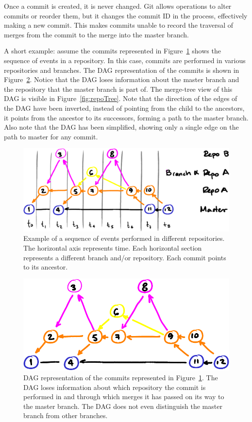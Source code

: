 \documentclass[conference, draftclsnofoot, draft]{IEEEtran}
\begin{document}
Once a commit is created, it is never changed. Git allows operations to alter
commits or reorder them, but it changes the commit ID in the process, effectively
making a new commit. This makes commits unable to record the traversal of merges
from the commit to the merge into the master branch.

A short example: assume the commits represented in Figure~\ref{fig:repoEvents} shows
the sequence of events in a repository. In this case, commits are performed in
various repositories and branches. The DAG representation of the commits is shown in
Figure~\ref{fig:repoDAG}. Notice that the DAG loses information about the master
branch and the repository that the master branch is part of. The merge-tree view of
this DAG is visible in Figure~\ref{fig:repoTree}. Note that the direction of the
edges of the DAG have been inverted, instead of pointing from the child to the
ancestors, it points from the ancestor to its successors, forming a path to the
master branch. Also note that the DAG has been simplified, showing only a single
edge on the path to master for any commit.

\begin{figure}[htbp]
        \centering
        \includegraphics[width=\columnwidth]{figures/events.pdf}
        \caption{Example of a sequence of events performed in different
                repositories. The horizontal axis represents time. Each horizontal
                section represents a different branch and/or repository. Each commit
                points to its ancestor.}
        \label{fig:repoEvents}
\end{figure}

\begin{figure}[htbp]
        \centering
        \includegraphics[width=.8\columnwidth]{figures/dag.pdf}
        \caption{DAG representation of the commits represented in
                Figure~\ref{fig:repoEvents}. The DAG loses information about which
                repository the commit is performed in and through which merges it
                has passed on its way to the master branch. The DAG does not even
                distinguish the master branch from other branches.}
        \label{fig:repoDAG}
\end{figure}
\end{document}
